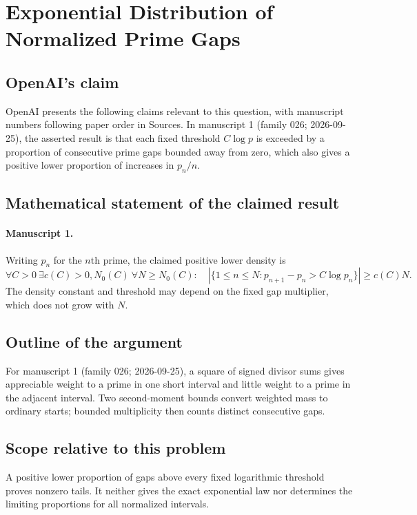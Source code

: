 \documentclass[11pt]{article}
\begin{document}
\section*{Exponential Distribution of Normalized Prime Gaps}

\subsection{OpenAI's claim}
OpenAI presents the following claims relevant to this question, with manuscript numbers following paper order in Sources. In manuscript 1 (family 026; 2026-09-25), the asserted result is that each fixed threshold $C\log p$ is exceeded by a proportion of consecutive prime gaps bounded away from zero, which also gives a positive lower proportion of increases in $p_n/n$.

\subsection{Mathematical statement of the claimed result}
\paragraph{Manuscript 1.}
Writing $p_n$ for the $n$th prime, the claimed positive lower density is
\[
 \forall C>0\ \exists c(C)>0,N_0(C)\ \forall N\ge N_0(C):
 \quad|\{1\le n\le N:p_{n+1}-p_n>C\log p_n\}|\ge c(C)N.
\]
The density constant and threshold may depend on the fixed gap multiplier, which does not grow with $N$.

\subsection{Outline of the argument}
For manuscript 1 (family 026; 2026-09-25), a square of signed divisor sums gives appreciable weight to a prime in one short interval and little weight to a prime in the adjacent interval. Two second-moment bounds convert weighted mass to ordinary starts; bounded multiplicity then counts distinct consecutive gaps.

\subsection{Scope relative to this problem}
A positive lower proportion of gaps above every fixed logarithmic threshold proves nonzero tails. It neither gives the exact exponential law nor determines the limiting proportions for all normalized intervals.
\end{document}
